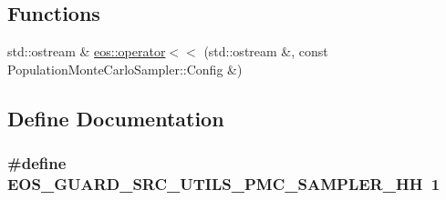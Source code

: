 \subsection*{Functions}
\begin{DoxyCompactItemize}
\item 
std::ostream \& \hyperlink{namespaceeos_ae82806395b35652601c81a77cdf89fae}{eos::operator$<$$<$} (std::ostream \&, const PopulationMonteCarloSampler::Config \&)
\end{DoxyCompactItemize}


\subsection{Define Documentation}
\hypertarget{population__monte__carlo__sampler_8hh_ae7e0494552bb66a66453c50c27203a49}{
\subsubsection[{EOS\_\-GUARD\_\-SRC\_\-UTILS\_\-PMC\_\-SAMPLER\_\-HH}]{\setlength{\rightskip}{0pt plus 5cm}\#define EOS\_\-GUARD\_\-SRC\_\-UTILS\_\-PMC\_\-SAMPLER\_\-HH~1}}
\label{population__monte__carlo__sampler_8hh_ae7e0494552bb66a66453c50c27203a49}
